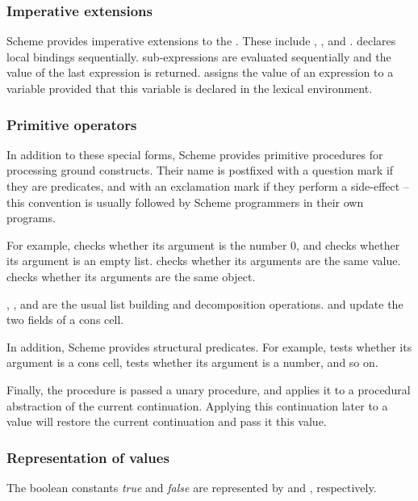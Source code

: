 \subsubsection{Imperative extensions}

Scheme provides imperative extensions to the \lc.  These include
, , and .   declares
local bindings sequentially.   sub-expressions are
evaluated sequentially and the value of the last expression is
returned.   assigns the value of an expression to a
variable provided that this variable is declared in the lexical
environment.

\subsubsection{Primitive operators}

In addition to these special forms, Scheme provides primitive
procedures for processing ground constructs.  Their name is postfixed
with a question mark if they are predicates, and with an exclamation
mark if they perform a side-effect -- this convention is usually
followed by Scheme programmers in their own programs.

For example,  checks whether its argument is the number 0,
and  checks whether its argument is an empty list.
 checks whether its arguments are the same value.
 checks whether its arguments are the same object.

, , and  are the usual list building
and decomposition operations.   and 
update the two fields of a cons cell.

In addition, Scheme provides structural predicates.  For example,
 tests whether its argument is a cons cell, 
tests whether its argument is a number, and so on.

Finally, the procedure  is passed a
unary procedure, and applies it to a procedural abstraction of the
current continuation.  Applying this continuation later to a value
will restore the current continuation and pass it this value.

\subsubsection{Representation of values}

The boolean constants {\it true} and {\it false} are represented by
 and , respectively.

